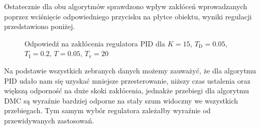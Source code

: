 Ostatecznie dla obu algorytmów sprawdzono wpływ zakłóceń wprowadzanych poprzez wciśnięcie odpowiedniego przycisku na płytce obiektu, wyniki regulacji przedstawiono poniżej.

\begin{figure}[H]
\centering

\caption{Odpowiedź na zakłócenia regulatora PID dla $K = 15$, $T_\mathrm{D} = 0.05$, $T_\mathrm{I} = 0.2$, $T = 0.05$, $T_\mathrm{v} = 20$}
\label{PIDbest}
\end{figure}

\begin{figure}[H]
\centering

\label{DMCbest}
\end{figure}

Na podstawie wszystkich zebranych danych możemy zauważyć, że dla algorytmu PID udało nam się uzyskać mniejsze przesterowanie, niższy czas ustalenia oraz większą odporność na duże skoki zakłócenia, jednakże przebiegi dla algorytmu DMC są wyraźnie bardziej odporne na stały szum widoczny we wszystkich przebiegach. Tym samym wybór regulatora zależałby wyraźnie od przewidywanych zastosowań.


